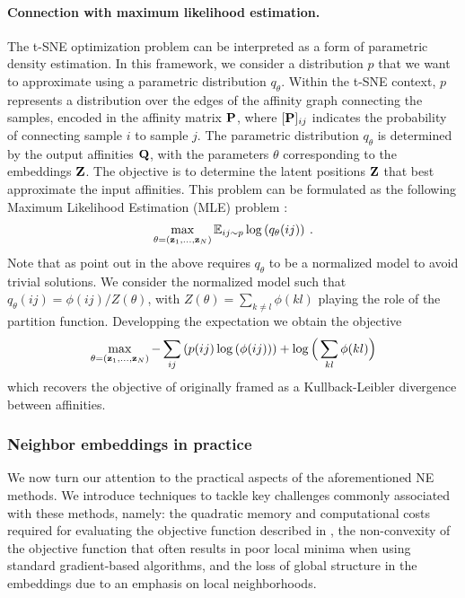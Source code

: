 \paragraph{Connection with maximum likelihood estimation.}
The t-SNE optimization problem can be interpreted as a form of parametric density estimation. In this framework, we consider a distribution $p$ that we want to approximate using a parametric distribution $q_{\theta}$. Within the t-SNE context, $p$ represents a distribution over the edges of the affinity graph connecting the samples, encoded in the affinity matrix ${\mathbf{P}}$, where $[{\mathbf{P}}]_{ij}$ indicates the probability of connecting sample $i$ to sample $j$. The parametric distribution $q_{\theta}$ is determined by the output affinities ${\mathbf{Q}}$, with the parameters $\theta$ corresponding to the embeddings ${\mathbf{Z}}$. The objective is to determine the latent positions ${\mathbf{Z}}$ that best approximate the input affinities.
This problem can be formulated as the following Maximum Likelihood Estimation (MLE) problem \citep{damrich2022t}:
\begin{align}
    \max_{\theta = ({\mathbf{z}}_1, ..., {\mathbf{z}}_N)} \mathbb{E}_{ij \sim p} \log \left( q_{\theta}(ij) \right) \:.
\end{align}
Note that as point out in  the above requires $q_{\theta}$ to be a normalized model to avoid trivial solutions.
We consider the normalized model such that $q_{\theta}(ij) = \phi(ij) / Z(\theta)$, with $Z(\theta) = \sum_{k \neq l} \phi(kl)$ playing the role of the partition function. Developping the expectation we obtain the objective
\begin{align}
    \max_{\theta = ({\mathbf{z}}_1, ..., {\mathbf{z}}_N)}  - \sum_{ij} \left( p(ij) \log \left( \phi(ij) \right) \right) + \log \Big( \sum_{kl} \phi(kl) \Big)
\end{align}
which recovers the objective of  originally framed as a Kullback-Leibler divergence between affinities.

\subsubsection{Neighbor embeddings in practice}

We now turn our attention to the practical aspects of the aforementioned NE methods. We introduce techniques to tackle key challenges commonly associated with these methods, namely: the quadratic memory and computational costs required for evaluating the objective function described in , the non-convexity of the objective function that often results in poor local minima when using standard gradient-based algorithms, and the loss of global structure in the embeddings due to an emphasis on local neighborhoods.

